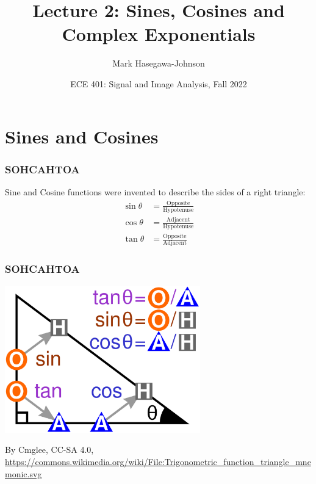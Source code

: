 \documentclass{beamer}
\title{Lecture 2: Sines, Cosines and Complex Exponentials}
\author{Mark Hasegawa-Johnson}
\date{ECE 401: Signal and Image Analysis, Fall 2022}
\begin{document}
\begin{frame}
  \maketitle
\end{frame}

\begin{frame}
  \tableofcontents
\end{frame}

\section[Cosines]{Sines and Cosines}
\setcounter{subsection}{1}

\begin{frame}
  \frametitle{SOHCAHTOA}

  Sine and Cosine functions were invented to describe the sides of a right triangle:
  \begin{align*}
    \sin\theta &= \frac{\mbox{Opposite}}{\mbox{Hypotenuse}}\\
    \cos\theta &= \frac{\mbox{Adjacent}}{\mbox{Hypotenuse}}\\
    \tan\theta &= \frac{\mbox{Opposite}}{\mbox{Adjacent}}
  \end{align*}
\end{frame}

\begin{frame}
  \frametitle{SOHCAHTOA}

  \centerline{\includegraphics[height=2.5in]{sohcahtoa.png}}
  \begin{tiny}
    By Cmglee, CC-SA 4.0,
    \url{https://commons.wikimedia.org/wiki/File:Trigonometric_function_triangle_mnemonic.svg}
  \end{tiny}
\end{frame}
\end{document}
